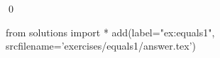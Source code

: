 
\begin{ex} 
  \label{ex:equals1}
  
  \qed
\end{ex} 
\begin{python0}
from solutions import *
add(label="ex:equals1",
    srcfilename='exercises/equals1/answer.tex') 
\end{python0}
